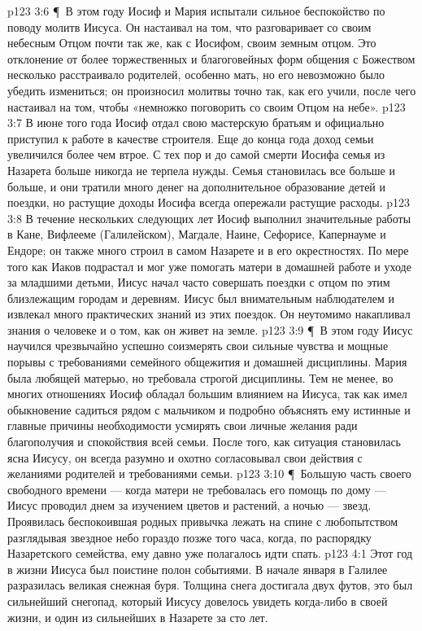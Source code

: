 \vs p123 3:6 \P\ В этом году Иосиф и Мария испытали сильное беспокойство по поводу молитв Иисуса. Он настаивал на том, что разговаривает со своим небесным Отцом почти так же, как с Иосифом, своим земным отцом. Это отклонение от более торжественных и благоговейных форм общения с Божеством несколько расстраивало родителей, особенно мать, но его невозможно было убедить измениться; он произносил молитвы точно так, как его учили, после чего настаивал на том, чтобы «немножко поговорить со своим Отцом на небе».
\vs p123 3:7 В июне того года Иосиф отдал свою мастерскую братьям и официально приступил к работе в качестве строителя. Еще до конца года доход семьи увеличился более чем втрое. С тех пор и до самой смерти Иосифа семья из Назарета больше никогда не терпела нужды. Семья становилась все больше и больше, и они тратили много денег на дополнительное образование детей и поездки, но растущие доходы Иосифа всегда опережали растущие расходы.
\vs p123 3:8 В течение нескольких следующих лет Иосиф выполнил значительные работы в Кане, Вифлееме (Галилейском), Магдале, Наине, Сефорисе, Капернауме и Ендоре; он также много строил в самом Назарете и в его окрестностях. По мере того как Иаков подрастал и мог уже помогать матери в домашней работе и уходе за младшими детьми, Иисус начал часто совершать поездки с отцом по этим близлежащим городам и деревням. Иисус был внимательным наблюдателем и извлекал много практических знаний из этих поездок. Он неутомимо накапливал знания о человеке и о том, как он живет на земле.
\vs p123 3:9 \P\ В этом году Иисус научился чрезвычайно успешно соизмерять свои сильные чувства и мощные порывы с требованиями семейного общежития и домашней дисциплины. Мария была любящей матерью, но требовала строгой дисциплины. Тем не менее, во многих отношениях Иосиф обладал большим влиянием на Иисуса, так как имел обыкновение садиться рядом с мальчиком и подробно объяснять ему истинные и главные причины необходимости усмирять свои личные желания ради благополучия и спокойствия всей семьи. После того, как ситуация становилась ясна Иисусу, он всегда разумно и охотно согласовывал свои действия с желаниями родителей и требованиями семьи.
\vs p123 3:10 \P\ Большую часть своего свободного времени --- когда матери не требовалась его помощь по дому --- Иисус проводил днем за изучением цветов и растений, а ночью --- звезд. Проявилась беспокоившая родных привычка лежать на спине с любопытством разглядывая звездное небо гораздо позже того часа, когда, по распорядку Назаретского семейства, ему давно уже полагалось идти спать.
\vs p123 4:1 Этот год в жизни Иисуса был поистине полон событиями. В начале января в Галилее разразилась великая снежная буря. Толщина снега достигала двух футов, это был сильнейший снегопад, который Иисусу довелось увидеть когда\hyp{}либо в своей жизни, и один из сильнейших в Назарете за сто лет.
